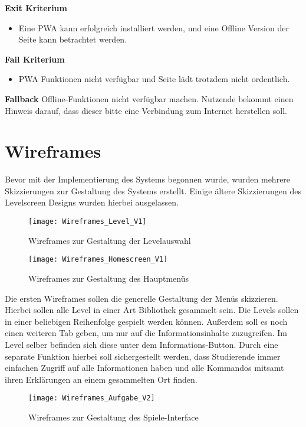 \textbf{Exit Kriterium}
\begin{itemize}
    \item Eine PWA kann erfolgreich installiert werden, und eine Offline Version der Seite kann betrachtet werden.
\end{itemize}

\textbf{Fail Kriterium}
\begin{itemize}
    \item PWA Funktionen nicht verfügbar und Seite lädt trotzdem nicht ordentlich.
\end{itemize}

\textbf{Fallback}
\newline Offline-Funktionen nicht verfügbar machen. Nutzende bekommt einen Hinweis darauf, dass dieser bitte eine Verbindung zum Internet herstellen soll.

\section{Wireframes}
\label{sec:wireframes}
Bevor mit der Implementierung des Systems begonnen wurde, wurden mehrere Skizzierungen zur Gestaltung des Systems erstellt.
Einige ältere Skizzierungen des Levelscreen Designs wurden hierbei ausgelassen.

\begin{figure}[h!]
    \centering
    \texttt{[image: Wireframes\_Level\_V1]}
    \caption{Wireframes zur Gestaltung der Levelauswahl}
\end{figure}

\begin{figure}[h!]
    \centering
    \texttt{[image: Wireframes\_Homescreen\_V1]}
    \caption{Wireframes zur Gestaltung des Hauptmenüs}
\end{figure}

Die ersten Wireframes sollen die generelle Gestaltung der Menüs skizzieren.
Hierbei sollen alle Level in einer Art Bibliothek gesammelt sein. Die Levels sollen in einer beliebigen Reihenfolge gespielt werden können. Außerdem soll es noch einen weiteren Tab geben, um nur auf die Informationsinhalte zuzugreifen. Im Level selber befinden sich diese unter dem Informations-Button.
Durch eine separate Funktion hierbei soll sichergestellt werden, dass Studierende immer einfachen Zugriff auf alle Informationen haben und alle Kommandos mitsamt ihren Erklärungen an einem gesammelten Ort finden.

\begin{figure}[h!]
    \centering
    \texttt{[image: Wireframes\_Aufgabe\_V2]}
    \caption{Wireframes zur Gestaltung des Spiele-Interface}
\end{figure}

